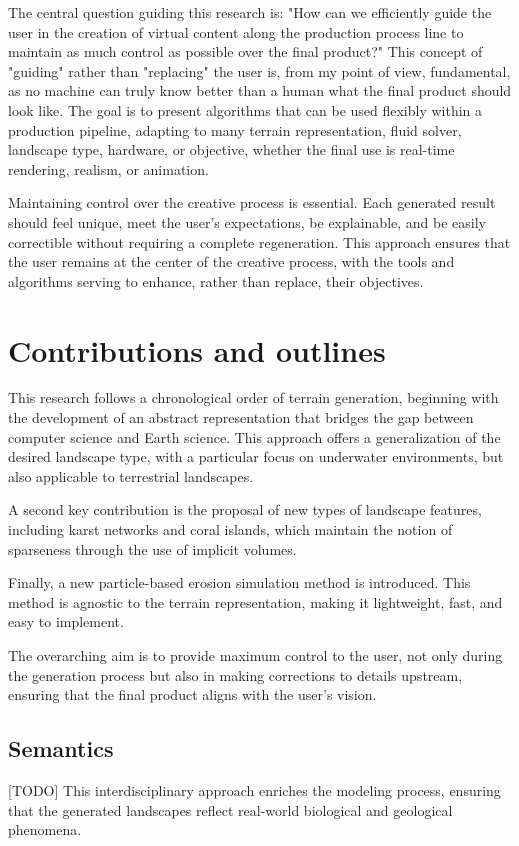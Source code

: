 The central question guiding this research is: "How can we efficiently guide the user in the creation of virtual content along the production process line to maintain as much control as possible over the final product?" This concept of "guiding" rather than "replacing" the user is, from my point of view, fundamental, as no machine can truly know better than a human what the final product should look like. The goal is to present algorithms that can be used flexibly within a production pipeline, adapting to many terrain representation, fluid solver, landscape type, hardware, or objective, whether the final use is real-time rendering, realism, or animation.

Maintaining control over the creative process is essential. Each generated result should feel unique, meet the user's expectations, be explainable, and be easily correctible without requiring a complete regeneration. This approach ensures that the user remains at the center of the creative process, with the tools and algorithms serving to enhance, rather than replace, their objectives.

\section{Contributions and outlines}
This research follows a chronological order of terrain generation, beginning with the development of an abstract representation that bridges the gap between computer science and Earth science. This approach offers a generalization of the desired landscape type, with a particular focus on underwater environments, but also applicable to terrestrial landscapes.

A second key contribution is the proposal of new types of landscape features, including karst networks and coral islands, which maintain the notion of sparseness through the use of implicit volumes. 

Finally, a new particle-based erosion simulation method is introduced. This method is agnostic to the terrain representation, making it lightweight, fast, and easy to implement. 

The overarching aim is to provide maximum control to the user, not only during the generation process but also in making corrections to details upstream, ensuring that the final product aligns with the user's vision.

\subsection{Semantics}
[TODO]
This interdisciplinary approach enriches the modeling process, ensuring that the generated landscapes reflect real-world biological and geological phenomena.

